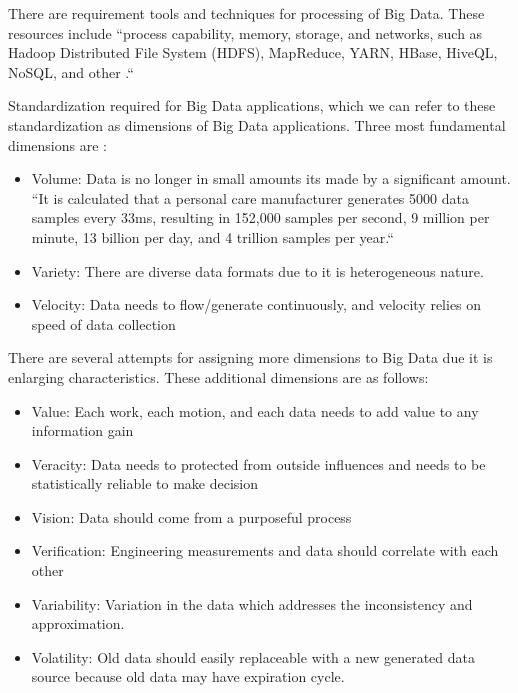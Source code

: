 \documentclass[sigconf]{acmart}
\begin{document}
\par There are requirement tools and techniques for processing of Big Data. These resources include ``process capability, memory, storage, and networks, such as Hadoop Distributed File System (HDFS), MapReduce, YARN, HBase, HiveQL, NoSQL, and other \cite{BABICEANU2016128}.``

\par Standardization required for Big Data applications, which we can refer to these standardization as dimensions of Big Data applications. Three most fundamental dimensions are \cite{BABICEANU2016128, ZHONG2016572}:

\begin{itemize}
    \item Volume: Data is no longer in small amounts its made by a significant amount. ``It is calculated that a personal care manufacturer generates 5000 data samples every 33ms, resulting in 152,000 samples per second, 9 million per minute, 13 billion per day, and 4 trillion samples per year.``
    \item Variety: There are diverse data formats due to it is heterogeneous nature. 
    \item Velocity: Data needs to flow/generate continuously, and velocity relies on speed of data collection
\end{itemize}

\par There are several attempts for assigning more dimensions to Big Data due it is enlarging characteristics. These additional dimensions are as follows\cite{BABICEANU2016128}: 

\begin{itemize}
    \item Value: Each work, each motion, and each data needs to add value to any information gain
    \item Veracity: Data needs to protected from outside influences and needs to be statistically reliable to make decision
    \item Vision: Data should come from a purposeful process
    \item Verification: Engineering measurements and data should correlate with each other
    \item Variability: Variation in the data which addresses the inconsistency and approximation. 
    \item Volatility: Old data should easily replaceable with a new generated data source because old data may have expiration cycle.
    \end{itemize}
    
\end{document}
